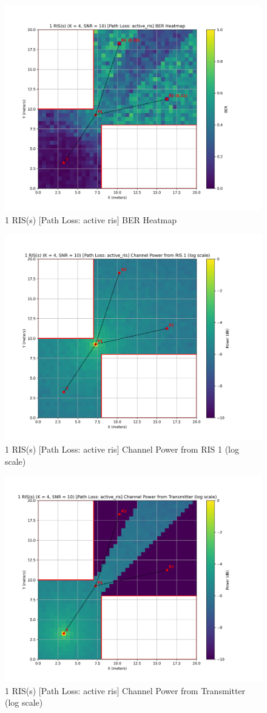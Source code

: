 \begin{figure}[H]
  \centering
  \includegraphics[width=0.7\linewidth]{imgs/heatmap-simulations/1 RIS(s) (K = 4, SNR = 10) [Path Loss_ active_ris] BER Heatmap.png}
  \caption{1 RIS(s) [Path Loss: active ris] BER Heatmap}
\end{figure}

\begin{figure}[H]
  \centering
  \includegraphics[width=0.7\linewidth]{imgs/heatmap-simulations/1 RIS(s) (K = 4, SNR = 10) [Path Loss_ active_ris] Channel Power from RIS 1 (log scale).png}
  \caption{1 RIS(s) [Path Loss: active ris] Channel Power from RIS 1 (log scale)}
\end{figure}

\begin{figure}[H]
  \centering
  \includegraphics[width=0.7\linewidth]{imgs/heatmap-simulations/1 RIS(s) (K = 4, SNR = 10) [Path Loss_ active_ris] Channel Power from Transmitter (log scale).png}
  \caption{1 RIS(s) [Path Loss: active ris] Channel Power from Transmitter (log scale)}
\end{figure}

